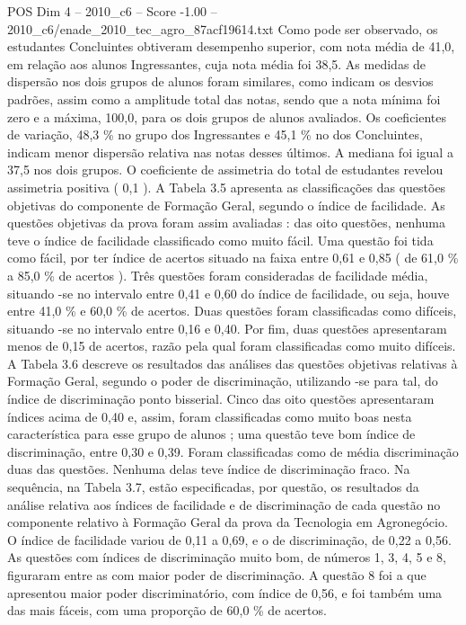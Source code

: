 \begin{textsample}{POS Dim 4 – 2010\_c6 – Score -1.00 – 2010\_c6/enade\_2010\_tec\_agro\_87acf19614.txt}
Como pode ser observado, os estudantes Concluintes obtiveram desempenho superior, com nota média de 41,0, em relação aos alunos Ingressantes, cuja nota média foi 38,5.
As medidas de dispersão nos dois grupos de alunos foram similares, como indicam os desvios padrões, assim como a amplitude total das notas, sendo que a nota mínima foi zero e a máxima, 100,0, para os dois grupos de alunos avaliados.
Os coeficientes de variação, 48,3 \% no grupo dos Ingressantes e 45,1 \% no dos Concluintes, indicam menor dispersão relativa nas notas desses últimos.
A mediana foi igual a 37,5 nos dois grupos.
O coeficiente de assimetria do total de estudantes revelou assimetria positiva ( 0,1 ).
A Tabela 3.5 apresenta as classificações das questões objetivas do componente de Formação Geral, segundo o índice de facilidade.
As questões objetivas da prova foram assim avaliadas : das oito questões, nenhuma teve o índice de facilidade classificado como muito fácil.
Uma questão foi tida como fácil, por ter índice de acertos situado na faixa entre 0,61 e 0,85 ( de 61,0 \% a 85,0 \% de acertos ).
Três questões foram consideradas de facilidade média, situando -se no intervalo entre 0,41 e 0,60 do índice de facilidade, ou seja, houve entre 41,0 \% e 60,0 \% de acertos.
Duas questões foram classificadas como difíceis, situando -se no intervalo entre 0,16 e 0,40.
Por fim, duas questões apresentaram menos de 0,15 de acertos, razão pela qual foram classificadas como muito difíceis.
A Tabela 3.6 descreve os resultados das análises das questões objetivas relativas à Formação Geral, segundo o poder de discriminação, utilizando -se para tal, do índice de discriminação ponto bisserial.
Cinco das oito questões apresentaram índices acima de 0,40 e, assim, foram classificadas como muito boas nesta característica para esse grupo de alunos ; uma questão teve bom índice de discriminação, entre 0,30 e 0,39.
Foram classificadas como de média discriminação duas das questões.
Nenhuma delas teve índice de discriminação fraco.
Na sequência, na Tabela 3.7, estão especificadas, por questão, os resultados da análise relativa aos índices de facilidade e de discriminação de cada questão no componente relativo à Formação Geral da prova da Tecnologia em Agronegócio.
O índice de facilidade variou de 0,11 a 0,69, e o de discriminação, de 0,22 a 0,56.
As questões com índices de discriminação muito bom, de números 1, 3, 4, 5 e 8, figuraram entre as com maior poder de discriminação.
A questão 8 foi a que apresentou maior poder discriminatório, com índice de 0,56, e foi também uma das mais fáceis, com uma proporção de 60,0 \% de acertos.

\end{textsample}
